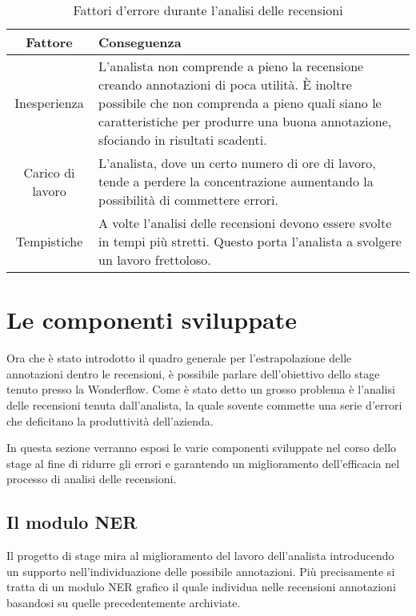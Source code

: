 \begin{table}[ht]
\begin{center}
\begin{tabular}{|c|p{10cm}|}
\hline
\textbf{Fattore} & \textbf{Conseguenza} \\ \hline
Inesperienza &
L'analista non comprende a pieno la recensione creando annotazioni di poca
utilità. È inoltre possibile che non comprenda a pieno quali siano le
caratteristiche per produrre una buona annotazione, sfociando in risultati
scadenti. \\ \hline
Carico di lavoro &
L'analista, dove un certo numero di ore di lavoro, tende a perdere la
concentrazione aumentando la possibilità di commettere errori. \\ \hline
Tempistiche &
A volte l'analisi delle recensioni devono essere svolte in tempi più stretti.
Questo porta l'analista a svolgere un lavoro frettoloso.
\\ \hline
\end{tabular}
\end{center}
\caption{Fattori d'errore durante l'analisi delle recensioni}
\label{tab:fattori_errore}
\end{table}

\section{Le componenti sviluppate}
Ora che è stato introdotto il quadro generale per l'estrapolazione delle
annotazioni dentro le recensioni, è possibile parlare dell'obiettivo dello stage
tenuto presso la Wonderflow. Come è stato detto un grosso problema è l'analisi
delle recensioni tenuta dall'analista, la quale sovente commette una serie
d'errori che deficitano la produttività dell'azienda.

In questa sezione verranno esposi le varie componenti sviluppate nel corso dello
stage al fine di ridurre gli errori e garantendo un miglioramento dell'efficacia
nel processo di analisi delle recensioni.

\subsection{Il modulo NER}
Il progetto di stage mira al miglioramento del lavoro dell'analista introducendo
un supporto nell'individuazione delle possibile annotazioni. Più precisamente
si tratta di un modulo \gls{NER} grafico il quale individua nelle recensioni
annotazioni basandosi su quelle precedentemente archiviate.

